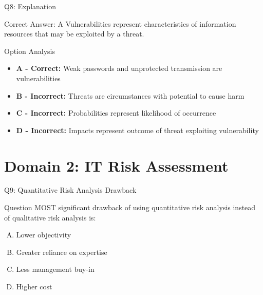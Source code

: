 \documentclass{beamer}
\begin{document}
	\begin{frame}{Q8: Explanation}
		\begin{block}{Correct Answer: A}
			Vulnerabilities represent characteristics of information resources that may be exploited by a threat.
		\end{block}
		\begin{block}{Option Analysis}
			\begin{itemize}
				\item \textbf{A - Correct:} Weak passwords and unprotected transmission are vulnerabilities
				\item \textbf{B - Incorrect:} Threats are circumstances with potential to cause harm
				\item \textbf{C - Incorrect:} Probabilities represent likelihood of occurrence
				\item \textbf{D - Incorrect:} Impacts represent outcome of threat exploiting vulnerability
			\end{itemize}
		\end{block}
	\end{frame}
	
	
	\section{Domain 2: IT Risk Assessment}
	
	\begin{frame}{Q9: Quantitative Risk Analysis Drawback}
		\begin{block}{Question}
			MOST significant drawback of using quantitative risk analysis instead of qualitative risk analysis is:
		\end{block}
		\begin{enumerate}[(A)]
			\item Lower objectivity
			\item Greater reliance on expertise
			\item Less management buy-in
			\item Higher cost
		\end{enumerate}
	\end{frame}
	
\end{document}
